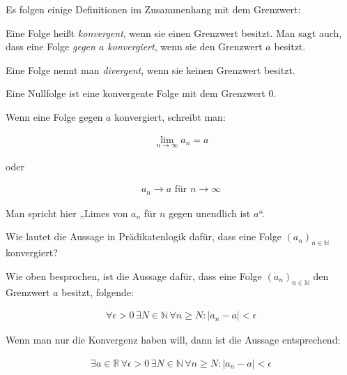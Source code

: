 \documentclass[fontsize=9pt,
               parskip=half-,
               DIV=14,
               listof=chapterentry,
               tocflat]{scrbook}
\begin{document}
Es folgen einige Definitionen im Zusammenhang mit dem Grenzwert:

\begin{description}[style=nextline]
\item[Konvergenz]
Eine Folge heißt \emph{konvergent}, wenn sie einen Grenzwert besitzt. Man sagt auch, dass eine Folge \emph{gegen $a$ konvergiert}, wenn sie den Grenzwert $a$ besitzt.\item[Divergenz]
Eine Folge nennt man \emph{divergent}, wenn sie keinen Grenzwert besitzt.\item[Nullfolge]
Eine Nullfolge ist eine konvergente Folge mit dem Grenzwert $0$.\end{description}

Wenn eine Folge gegen $a$ konvergiert, schreibt man:

\begin{align*}
\lim _{n\to \infty }a_{n}=a
\end{align*}

oder

\begin{align*}
a_{n}\rightarrow a{\text{ für }}n\rightarrow \infty 
\end{align*}

Man spricht hier „Limes von $a_{n}$ für $n$ gegen unendlich ist $a$“.

\begin{mdframed}[style=semanticbox,frametitleaboveskip=3pt,innerbottommargin=3pt,frametitle=Frage]
Wie lautet die Aussage in Prädikatenlogik dafür, dass eine Folge $(a_{n})_{n\in \mathbb {N} }$ konvergiert?

\end{mdframed}

\begin{answer*}
Wie oben besprochen, ist die Aussage dafür, dass eine Folge $(a_{n})_{n\in \mathbb {N} }$ den Grenzwert $a$ besitzt, folgende:

\begin{align*}
\forall \epsilon >0\,\exists N\in \mathbb {N} \,\forall n\geq N:|a_{n}-a|<\epsilon 
\end{align*}

Wenn man nur die Konvergenz haben will, dann ist die Aussage entsprechend:

\begin{align*}
\exists a\in \mathbb {R} \,\forall \epsilon >0\,\exists N\in \mathbb {N} \,\forall n\geq N:|a_{n}-a|<\epsilon 
\end{align*}

\end{answer*}
\end{document}
